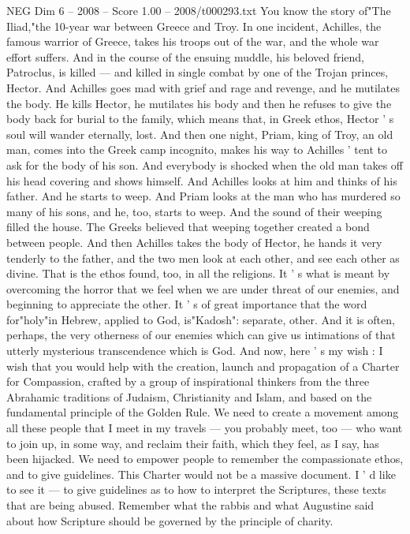 \begin{textsample}{NEG Dim 6 – 2008 – Score 1.00 – 2008/t000293.txt}
You know the story of"The Iliad,"the 10-year war between Greece and Troy.
In one incident, Achilles, the famous warrior of Greece, takes his troops out of the war, and the whole war effort suffers.
And in the course of the ensuing muddle, his beloved friend, Patroclus, is killed — and killed in single combat by one of the Trojan princes, Hector.
And Achilles goes mad with grief and rage and revenge, and he mutilates the body.
He kills Hector, he mutilates his body and then he refuses to give the body back for burial to the family, which means that, in Greek ethos, Hector ' s soul will wander eternally, lost.
And then one night, Priam, king of Troy, an old man, comes into the Greek camp incognito, makes his way to Achilles ' tent to ask for the body of his son.
And everybody is shocked when the old man takes off his head covering and shows himself.
And Achilles looks at him and thinks of his father.
And he starts to weep.
And Priam looks at the man who has murdered so many of his sons, and he, too, starts to weep.
And the sound of their weeping filled the house.
The Greeks believed that weeping together created a bond between people.
And then Achilles takes the body of Hector, he hands it very tenderly to the father, and the two men look at each other, and see each other as divine.
That is the ethos found, too, in all the religions.
It ' s what is meant by overcoming the horror that we feel when we are under threat of our enemies, and beginning to appreciate the other.
It ' s of great importance that the word for"holy"in Hebrew, applied to God, is"Kadosh": separate, other.
And it is often, perhaps, the very otherness of our enemies which can give us intimations of that utterly mysterious transcendence which is God.
And now, here ' s my wish : I wish that you would help with the creation, launch and propagation of a Charter for Compassion, crafted by a group of inspirational thinkers from the three Abrahamic traditions of Judaism, Christianity and Islam, and based on the fundamental principle of the Golden Rule.
We need to create a movement among all these people that I meet in my travels — you probably meet, too — who want to join up, in some way, and reclaim their faith, which they feel, as I say, has been hijacked.
We need to empower people to remember the compassionate ethos, and to give guidelines.
This Charter would not be a massive document.
I ' d like to see it — to give guidelines as to how to interpret the Scriptures, these texts that are being abused.
Remember what the rabbis and what Augustine said about how Scripture should be governed by the principle of charity.

\end{textsample}
